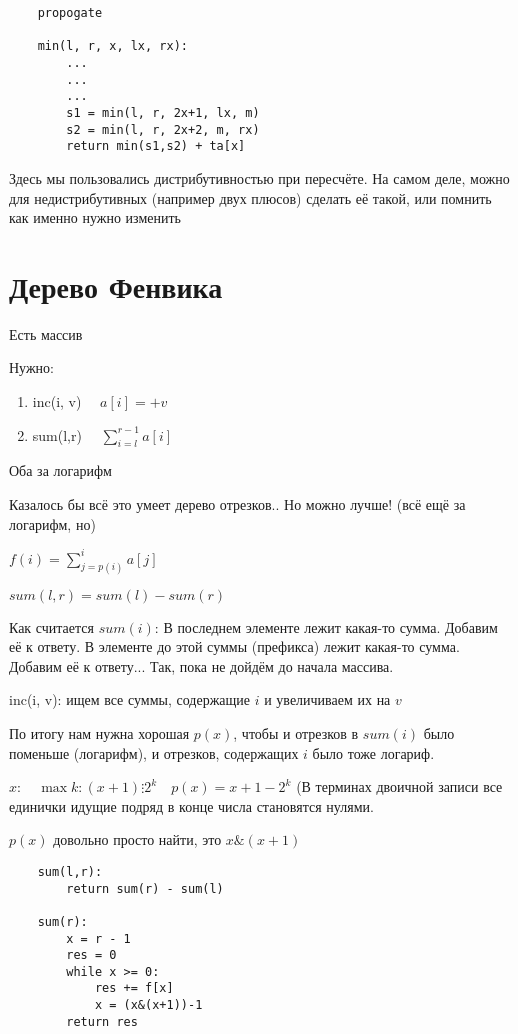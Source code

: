 \documentclass{book}
\theoremstyle{definition}
\begin{document}
\begin{verbatim}
    propogate

    min(l, r, x, lx, rx):
        ...
        ...
        ...
        s1 = min(l, r, 2x+1, lx, m)
        s2 = min(l, r, 2x+2, m, rx)
        return min(s1,s2) + ta[x]
\end{verbatim}

Здесь мы пользовались дистрибутивностью при пересчёте.
На самом деле, можно для недистрибутивных (например двух плюсов) сделать её такой, или помнить как именно нужно изменить

\section{Дерево Фенвика}

\begin{problem}
    Есть массив

    Нужно:
    \begin{enumerate}
        \item inc(i, v) $\quad a[i]=+v$
        \item sum(l,r)  $\quad \sum_{i=l}^{r-1} a[i]$
    \end{enumerate}

    Оба за логарифм
\end{problem}

Казалось бы всё это умеет дерево отрезков.. Но можно лучше! (всё ещё за логарифм, но) 

$f(i) = \sum_{j=p(i)}^{i} a[j]$ 

$sum(l, r) = sum(l) - sum(r)$

Как считается  $sum(i)$:
В последнем элементе лежит какая-то сумма. Добавим её к ответу. В  элементе до этой суммы (префикса) лежит какая-то сумма. Добавим её к ответу... Так, пока не дойдём до начала массива.

inc(i, v): ищем все суммы, содержащие $i$ и увеличиваем их на  $v$ 

По итогу нам нужна хорошая $p(x)$, чтобы и отрезков в  $sum(i)$ было поменьше (логарифм), и отрезков, содержащих  $i$ было тоже логариф.

$x:\quad \max k: (x+1) \vdots 2^k\quad p(x) = x+1-2^k$ (В терминах двоичной записи все единички идущие подряд в конце числа становятся нулями.

$p(x)$ довольно просто найти, это  $x\&(x+1)$

\begin{verbatim}
    sum(l,r):
        return sum(r) - sum(l)

    sum(r):
        x = r - 1
        res = 0
        while x >= 0:
            res += f[x]
            x = (x&(x+1))-1
        return res      
\end{verbatim}
\end{document}

